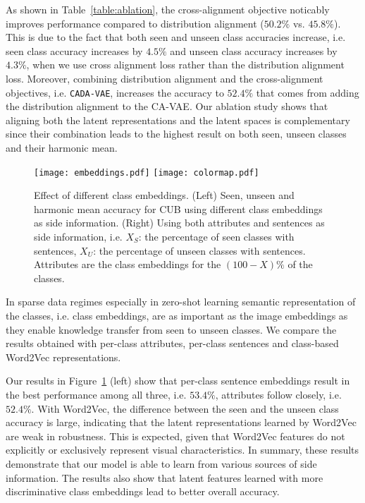 \documentclass[10pt,twocolumn,letterpaper]{article}
\newcommand{\myparagraph}[1]{\vspace{6pt}\noindent{\bf #1}}
\begin{document}
As shown in Table~\ref{table:ablation}, the cross-alignment objective noticably improves performance compared to distribution alignment ($50.2\%$ vs. $45.8\%$). This is due to the fact that both seen and unseen class accuracies increase, i.e. seen class accuracy increases by $4.5\%$ and unseen class accuracy increases by $4.3\%$, when we use cross alignment loss rather than the distribution alignment loss.
Moreover, combining distribution alignment and the cross-alignment objectives, i.e. \texttt{CADA-VAE}, increases the accuracy to $52.4\%$ that comes from adding the distribution alignment to the CA-VAE. 
Our ablation study shows that aligning both the latent representations and the latent spaces is complementary since their combination leads to the highest result on both seen, unseen classes and their harmonic mean.

\begin{figure}[t]
\centering
\texttt{[image: embeddings.pdf]}
\hfill
\texttt{[image: colormap.pdf]}
\caption{Effect of different class embeddings. (Left) Seen, unseen and harmonic mean accuracy for CUB using different class embeddings as side information. (Right) Using both attributes and sentences as side information, i.e. $X_S$: the percentage of seen classes with sentences, $X_U$: the percentage of unseen classes with sentences. Attributes are the class embeddings for the $(100-X)\%$ of the classes.
}
\label{fig:other_embeddings}
\end{figure}


\myparagraph{Analyzing Side Information.} 
In sparse data regimes especially in zero-shot learning semantic representation of the classes, i.e. class embeddings, are as important as the image embeddings as they enable knowledge transfer from seen to unseen classes. We compare the results obtained with per-class attributes, per-class sentences and class-based Word2Vec representations.

Our results in Figure~\ref{fig:other_embeddings} (left) show that per-class sentence embeddings result in the best performance among all three, i.e. $53.4\%$, attributes follow closely, i.e. $52.4\%$.
With Word2Vec, the difference between the seen and the unseen class accuracy is large, indicating that the latent representations learned by Word2Vec are weak in robustness. This is expected, given that Word2Vec features do not explicitly or exclusively represent visual characteristics. In summary, these results demonstrate that our model is able to learn from various sources of side information. The results also show that latent features learned with more discriminative class embeddings lead to better overall accuracy.
\end{document}
